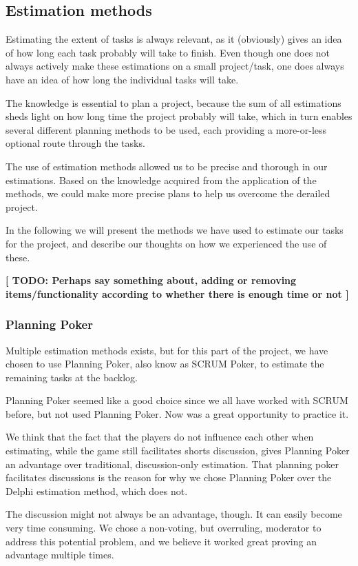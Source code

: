 \subsection{Estimation methods}
Estimating the extent of tasks is always relevant, as it (obviously) gives an idea of how long each task probably will take to finish. Even though one does not always actively make these estimations on a small project/task, one does always have an idea of how long the individual tasks will take.

The knowledge is essential to plan a project, because the sum of all estimations sheds light on how long time the project probably will take, which in turn enables several different planning methods to be used, each providing a more-or-less optional route through the tasks.

The use of estimation methods allowed us to be precise and thorough in our estimations. Based on the knowledge acquired from the application of the methods, we could make more precise plans to help us overcome the derailed project.

In the following we will present the methods we have used to estimate our tasks for the project, and describe our thoughts on how we experienced the use of these.

\textbf{ [ TODO: Perhaps say something about, adding or removing items/functionality according to whether there is enough time or not ]}

\subsubsection{Planning Poker}
Multiple estimation methods exists, but for this part of the project, we have chosen to use Planning Poker, also know as SCRUM Poker, to estimate the remaining tasks at the backlog.

Planning Poker seemed like a good choice since we all have worked with SCRUM before, but not used Planning Poker. Now was a great opportunity to practice it.

We think that the fact that the players do not influence each other when estimating, while the game still facilitates shorts discussion, gives Planning Poker an advantage over traditional, discussion-only estimation.
That planning poker facilitates discussions is the reason for why we chose Planning Poker over the Delphi estimation method, which does not.

The discussion might not always be an advantage, though. It can easily become very time consuming. We chose a non-voting, but overruling, moderator to address this potential problem, and we believe it worked great proving an advantage multiple times.

